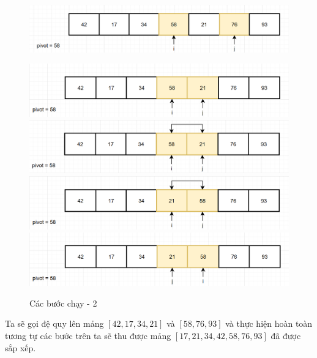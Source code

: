 \begin{figure}[H]
    \centering
    \includegraphics[width=1\linewidth]{img/quick_sort/6.png}
    
    \vspace{0.5cm}
    \includegraphics[width=1\linewidth]{img/quick_sort/7.png}
    \vspace{0.5cm}
    \includegraphics[width=1\linewidth]{img/quick_sort/8.png}
    \vspace{0.5cm}
    \includegraphics[width=1\linewidth]{img/quick_sort/9.png}
    \vspace{0.5cm}
    \includegraphics[width=1\linewidth]{img/quick_sort/10.png}
    \caption{Các bước chạy - 2}
\end{figure}

Ta sẽ gọi đệ quy lên mảng $[42,17,34,21]$ và $[58, 76,93]$ và thực hiện hoàn toàn tương tự các bước trên ta sẽ thu được mảng $[17, 21, 34, 42, 58, 76, 93]$ đã được sắp xếp.

